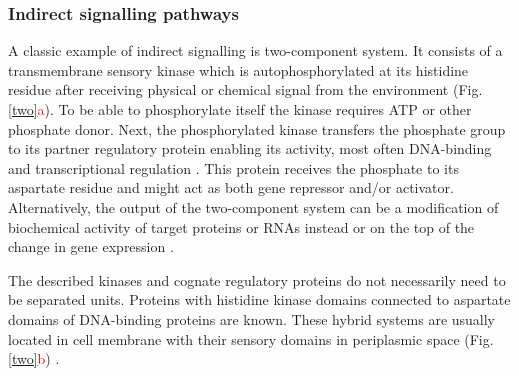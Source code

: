 \subsubsection{Indirect signalling pathways}
A classic example of indirect signalling is two-component system.
It consists of a transmembrane sensory kinase which is autophosphorylated at its histidine residue after receiving physical or chemical signal from the environment (Fig. \ref{two}\textcolor{red}{a}).
To be able to phosphorylate itself the kinase requires ATP or other phosphate donor.
Next, the phosphorylated kinase transfers the phosphate group to its partner regulatory protein enabling its activity, most often DNA-binding and transcriptional regulation \cite{lynch2012prioritization, gao2015temporal, cui2018novel}.
This protein receives the phosphate to its aspartate residue and might act as both gene repressor and/or activator.
Alternatively, the output of the two-component system can be a modification of biochemical activity of target proteins or RNAs instead or on the top of the change in gene expression \cite{shu2002antar, chambonnier2016hybrid}.

The described kinases and cognate regulatory proteins do not necessarily need to be separated units.
Proteins with histidine kinase domains connected to aspartate domains of DNA-binding proteins are known.
These hybrid systems are usually located in cell membrane with their sensory domains in periplasmic space (Fig. \ref{two}\textcolor{red}{b}) \cite{lynch2012prioritization, hirano2013regulon}.

